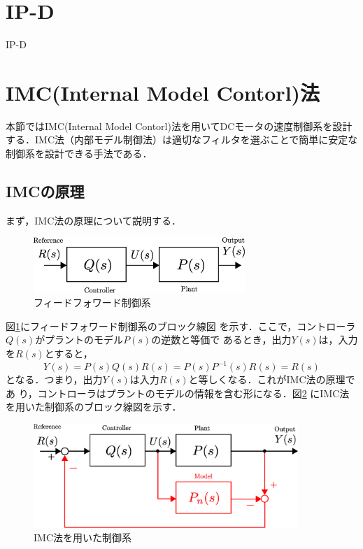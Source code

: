 \documentclass[a4paper,12pt]{jarticle}
\begin{document}
\section{IP-D}
IP-D
\section{IMC(Internal Model Contorl)法}
本節ではIMC(Internal Model Contorl)法を用いてDCモータの速度制御系を設計
する．IMC法（内部モデル制御法）は適切なフィルタを選ぶことで簡単に安定な
制御系を設計できる手法である．
\subsection{IMCの原理}
まず，IMC法の原理について説明する．
%
\begin{figure}[tbp]
 \begin{center}
  \includegraphics[width = 80mm]{fig/FF.eps}
 \end{center}
 \caption{フィードフォワード制御系}
 \label{fig:ff}
\end{figure}
%
図\ref{fig:ff}にフィードフォワード制御系のブロック線図
を示す．ここで，コントローラ$Q(s)$がプラントのモデル$P(s)$の逆数と等価で
あるとき，出力$Y(s)$は，入力を$R(s)$とすると，
\begin{equation}
Y(s) = P(s)Q(s)R(s) = P(s)P^{-1}(s)R(s) =R(s)
\end{equation}
となる．つまり，出力$Y(s)$は入力$R(s)$と等しくなる．これがIMC法の原理であ
り，コントローラはプラントのモデルの情報を含む形になる．図\ref{fig:IMC}
にIMC法を用いた制御系のブロック線図を示す．
%
\begin{figure}[tbp]
 \begin{center}
  \includegraphics[width = 100mm]{fig/IMC.eps}
 \end{center}
 \caption{IMC法を用いた制御系}
 \label{fig:IMC}
\end{figure}
\end{document}
